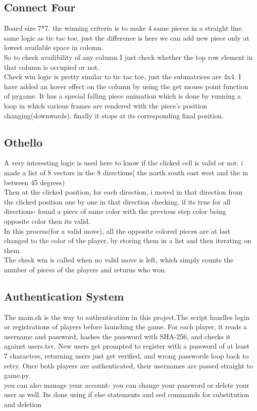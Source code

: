\documentclass[12pt]{article}
\begin{document}
\subsection{Connect Four}
Board size 7*7. the winning criteria is to make 4 same pieces in a straight line.\\
same logic as tic tac toe, just the difference is here we can add new piece only at lowest available space in colomn.\\
So to check availibility of any column I just check whether the top row element in that column is occupied or not.\\
Check win logic is pretty similar to tic tac toe, just the submatrices are 4x4. 
I have added an hover effect on the column by using the get mouse point function of pygame.
It has a special falling piece animation which is done by running a loop in which various frames are rendered with the piece's position changing(downwards). finally it stops at its corresponding final position.\\


\subsection{Othello}
A very interesting logic is used here to know if the clicked cell is valid or not. 
i made a list of 8 vectors in the 8 directions( the north south east west and the in between 45 degrees)\\

Then at the clicked position, for each direction, i moved in that direction from the clicked position one by one in that direction checking.
if its true for all directions- found a piece of same color with the previous step color being opposite color
then its valid.\\
In this process(for a valid move), all the opposite colored pieces are at last changed to the color of the player, by storing them in a list and then iterating on them.\\
The check win is called when no valid move is left, which simply counts the number of pieces of the players and returns who won.\\


\subsection{Authentication System}
The main.sh is the way to authentication in this project.The script handles login or registrations of players before launching the game. For each player, it reads a username and password, hashes the password with SHA-256, and checks it against users.tsv. New users get prompted to register with a password of at least 7 characters, returning users just get verified, and wrong passwords loop back to retry. Once both players are authenticated, their usernames are passed straight to game.py.\\
 you can also manage your account- you can change your password or delete your user as well. Its done using if else statements and sed commands for substitution and deletion
\end{document}
